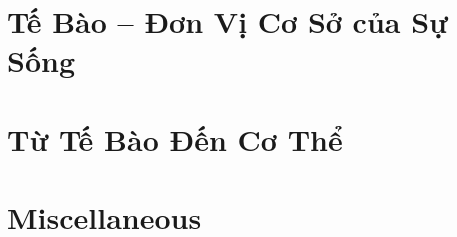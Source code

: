 \documentclass{article}
\begin{document}

\section{Tế Bào -- Đơn Vị Cơ Sở của Sự Sống}


\section{Từ Tế Bào Đến Cơ Thể}


\section{Miscellaneous}


\printbibliography[heading=bibintoc]
	
\end{document}
